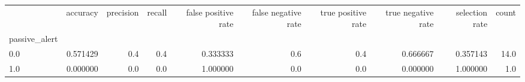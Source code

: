 \begin{tabular}{lrrrrrrrrr}
\toprule
{} &  accuracy &  precision &  recall &  false positive rate &  false negative rate &  true positive rate &  true negative rate &  selection rate &  count \\
passive\_alert &           &            &         &                      &                      &                     &                     &                 &        \\
\midrule
0.0           &  0.571429 &        0.4 &     0.4 &             0.333333 &                  0.6 &                 0.4 &            0.666667 &        0.357143 &   14.0 \\
1.0           &  0.000000 &        0.0 &     0.0 &             1.000000 &                  0.0 &                 0.0 &            0.000000 &        1.000000 &    1.0 \\
\bottomrule
\end{tabular}
